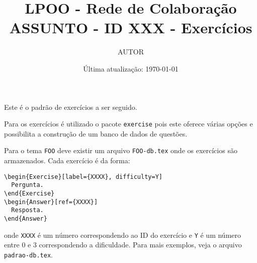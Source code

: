 \documentclass[a4paper,12pt]{article}
\title{ LPOO - Rede de Colaboração \\
ASSUNTO - ID XXX - Exercícios }
\author{ AUTOR }
\date{ Última atualização: \today }
\begin{document}
\maketitle

Este é o padrão de exercícios a ser seguido.

Para os exercícios é utilizado o pacote \verb+exercise+ pois este oferece várias
opções e possibilita a construção de um banco de dados de questões.

Para o tema \verb+FOO+ deve existir um arquivo \verb+FOO-db.tex+ onde os
exercícios são armazenados. Cada exercício é da forma:
\begin{lstlisting}
\begin{Exercise}[label={XXXX}, difficulty=Y]
  Pergunta.
\end{Exercise}
\begin{Answer}[ref={XXXX}]
  Resposta.
\end{Answer}
\end{lstlisting}
onde \verb+XXXX+ é um número correspondendo ao ID do exercício e \verb+Y+ é um
número entre 0 e 3 correspondendo a dificuldade. Para mais exemplos, veja o
arquivo \verb+padrao-db.tex+.


\ExerciseSelect[label={easy0, easy1, medium, hard, veryhard, lstlisting}]
\end{document}
